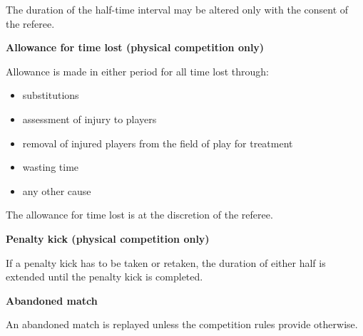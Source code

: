 The duration of the half-time interval may be altered only with the consent of the referee.

\bigskip

{\bfseries Allowance for time lost (physical competition only)}

\headlinebox

Allowance is made in either period for all time lost through:

\begin{itemize}
\item substitutions
\item assessment of injury to players
\item removal of injured players from the field of play for treatment
\item wasting time
\item any other cause
\end{itemize}

The allowance for time lost is at the discretion of the referee.

\bigskip

{\bfseries Penalty kick (physical competition only)}

\headlinebox

If a penalty kick has to be taken or retaken, the duration of either half is extended until the penalty kick is completed.

\bigskip

{\sffamily
\textbf{Abandoned match} }

\headlinebox

An abandoned match is replayed unless the competition rules provide otherwise.

\bigskip

